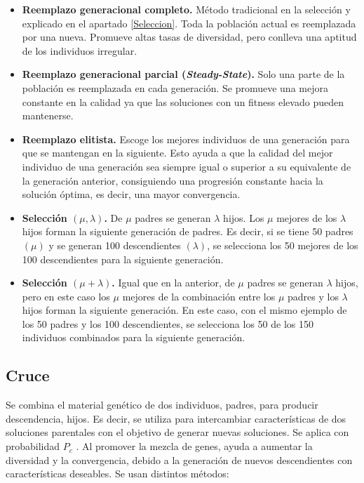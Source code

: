 \begin{itemize}
  \item \textbf{Reemplazo generacional completo.} Método tradicional en la selección y explicado en el apartado \ref{Seleccion}. Toda la población actual es reemplazada por una nueva. Promueve altas tasas de diversidad, pero conlleva una aptitud de los individuos irregular.
  \item \textbf{Reemplazo generacional parcial (\textit{Steady-State}).} Solo una parte de la población es reemplazada en cada generación. Se promueve una mejora constante en la calidad ya que las soluciones con un fitness elevado pueden mantenerse.
  \item \textbf{Reemplazo elitista.} Escoge los mejores individuos de una generación para que se mantengan en la siguiente. Esto ayuda a que la calidad del mejor individuo de una generación sea siempre igual o superior a su equivalente de la generación anterior, consiguiendo una progresión constante hacia la solución óptima, es decir, una mayor convergencia.
  \item \textbf{Selección $(\mu,\lambda)$.} De $\mu$ padres se generan $\lambda$ hijos. Los $\mu$ mejores de los $\lambda$ hijos forman la siguiente generación de padres. Es decir, si se tiene 50 padres $(\mu)$ y se generan 100 descendientes $(\lambda)$, se selecciona los 50 mejores de los 100 descendientes para la siguiente generación.
  \item \textbf{Selección $(\mu+\lambda)$.} Igual que en la anterior, de $\mu$ padres se generan $\lambda$ hijos, pero en este caso los $\mu$ mejores de la combinación entre los $\mu$ padres y los $\lambda$ hijos forman la siguiente generación. En este caso, con el mismo ejemplo de los 50 padres y los 100 descendientes, se selecciona los 50 de los 150 individuos combinados para la siguiente generación.
\end{itemize}

\subsection{Cruce}

Se combina el material genético de dos individuos, padres, para producir descendencia, hijos. Es decir, se utiliza para intercambiar características de dos soluciones parentales con el objetivo de generar nuevas soluciones. Se aplica con probabilidad \(P_c\) . Al promover la mezcla de genes, ayuda a aumentar la diversidad y la convergencia, debido a la generación de nuevos descendientes con características deseables. Se usan distintos métodos:


